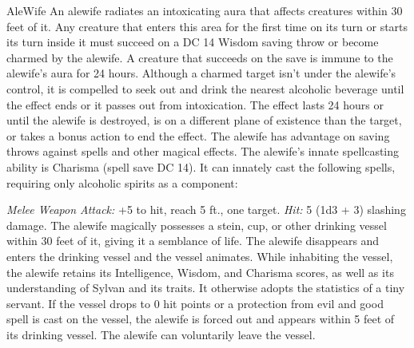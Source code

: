 \documentclass[10pt,a4paper,twoside,twocolumn,openany,bg=print,nodeprecatedcode]{dndbook}
\begin{document}
\begin{DndMonster}[float*=t]{AleWife}
\DndMonsterBasics[
armor-class = {13},
hit-points = {\DndDice{4d6 + 8}},
speed = {20 ft., 20 ft. (key)}
]
\DndMonsterAbilityScores[
 str = 3,
 dex = 16,
 con = 14,
 int = 10,
 wis = 8,
 cha = 19
]
\DndMonsterDetails[
skills = {Insight +1, Perception +1, Stealth +7},
languages = {Common, Sylvan},
challenge = 1/2,
]
An alewife radiates an intoxicating aura that affects creatures within 30 feet of it. Any creature that enters this area for the first time on its turn or starts its turn inside it must succeed on a DC 14 Wisdom saving throw or become charmed by the alewife. A creature that succeeds on the save is immune to the alewife's aura for 24 hours. Although a charmed target isn't under the alewife's control, it is compelled to seek out and drink the nearest alcoholic beverage until the effect ends or it passes out from intoxication. The effect lasts 24 hours or until the alewife is destroyed, is on a different plane of existence than the target, or takes a bonus action to end the effect.
The alewife has advantage on saving throws against spells and other magical effects.
The alewife's innate spellcasting ability is Charisma (spell save DC 14). It can innately cast the following spells, requiring only alcoholic spirits as a component:
\begin{DndMonsterSpells}
\end{DndMonsterSpells}
\par
{}
\textsl{Melee Weapon Attack:} +5 to hit, reach 5 ft., one target. \textsl{Hit:} 5 (1d3 + 3) slashing damage.
The alewife magically possesses a stein, cup, or other drinking vessel within 30 feet of it, giving it a semblance of life. The alewife disappears and enters the drinking vessel and the vessel animates. While inhabiting the vessel, the alewife retains its Intelligence, Wisdom, and Charisma scores, as well as its understanding of Sylvan and its traits. It otherwise adopts the statistics of a tiny servant.
If the vessel drops to 0 hit points or a protection from evil and good spell is cast on the vessel, the alewife is forced out and appears within 5 feet of its drinking vessel. The alewife can voluntarily leave the vessel.
\end{DndMonster}
\end{document}
